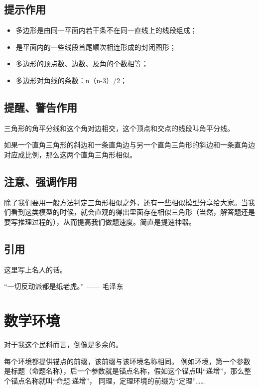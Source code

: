 \documentclass{ctexart}
\begin{document}
\subsection{提示作用}
\begin{提示}
    \begin{itemize}
    \item{多边形是由同一平面内若干条不在同一直线上的线段组成；}
    \item{是平面内的一些线段首尾顺次相连形成的封闭图形；}
    \item{多边形的顶点数、边数、及角的个数相等；}
    \item{多边形对角线的条数：n（n-3）/2；}
    \end{itemize}
\end{提示}

\subsection{提醒、警告作用}
\begin{提醒}
    三角形的角平分线和这个角对边相交，这个顶点和交点的线段叫角平分线。

    如果一个直角三角形的斜边和一条直角边与另一个直角三角形的斜边和一条直角边对应成比例，那么这两个直角三角形相似。
\end{提醒}

\subsection{注意、强调作用}
\begin{注意}
除了我们要用一般方法判定三角形相似之外，还有一些相似模型分享给大家。当我们看到这类模型的时候，就会直观的得出里面存在相似三角形（当然，解答题还是要写推理过程的），从而提高我们做题速度。简直是提速神器。
\end{注意}

\subsection{引用}
\begin{引用}
    这里写上名人的话。

    “一切反动派都是纸老虎。” —— 毛泽东
\end{引用}

\section{数学环境}
对于我这个民科而言，倒像是多余的。

每个环境都提供锚点的前缀，该前缀与该环境名称相同。
例如环境，第一个参数是标题（命题名称），后一个参数就是锚点名称，假如这个锚点叫“递增”，那么整个锚点名称就叫“命题:递增”，
同理，定理环境的前缀为“定理”……
\end{document}
